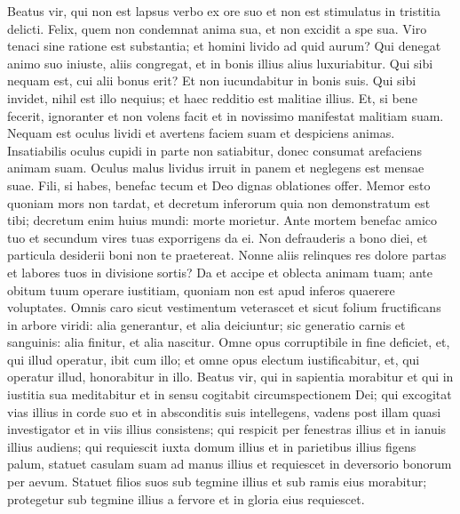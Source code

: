 \begin{biblechapter}  
\verse Beatus vir, qui non est lapsus verbo ex ore suo et non est stimulatus in tristitia delicti. 
\verse Felix, quem non condemnat anima sua, et non excidit a spe sua. 
\verse Viro tenaci sine ratione est substantia; et homini livido ad quid aurum? 
\verse Qui denegat animo suo iniuste, aliis congregat, et in bonis illius alius luxuriabitur. 
\verse Qui sibi nequam est, cui alii bonus erit? Et non iucundabitur in bonis suis. 
\verse Qui sibi invidet, nihil est illo nequius; et haec redditio est malitiae illius. 
\verse Et, si bene fecerit, ignoranter et non volens facit et in novissimo manifestat malitiam suam. 
\verse Nequam est oculus lividi et avertens faciem suam et despiciens animas. 
\verse Insatiabilis oculus cupidi in parte non satiabitur, donec consumat arefaciens animam suam. 
\verse Oculus malus lividus irruit in panem et neglegens est mensae suae. 
\verse Fili, si habes, benefac tecum et Deo dignas oblationes offer. 
\verse Memor esto quoniam mors non tardat, et decretum inferorum quia non demonstratum est tibi; decretum enim huius mundi: morte morietur. 
\verse Ante mortem benefac amico tuo et secundum vires tuas exporrigens da ei. 
\verse Non defrauderis a bono diei, et particula desiderii boni non te praetereat. 
\verse Nonne aliis relinques res dolore partas et labores tuos in divisione sortis? 
\verse Da et accipe et oblecta animam tuam; 
\verse ante obitum tuum operare iustitiam, quoniam non est apud inferos quaerere voluptates. 
\verse Omnis caro sicut vestimentum veterascet et sicut folium fructificans in arbore viridi: alia generantur, et alia deiciuntur; 
\verse sic generatio carnis et sanguinis: alia finitur, et alia nascitur. 
\verse Omne opus corruptibile in fine deficiet, et, qui illud operatur, ibit cum illo; 
\verse et omne opus electum iustificabitur, et, qui operatur illud, honorabitur in illo. 
\verse Beatus vir, qui in sapientia morabitur et qui in iustitia sua meditabitur et in sensu cogitabit circumspectionem Dei; 
\verse qui excogitat vias illius in corde suo et in absconditis suis intellegens, vadens post illam quasi investigator et in viis illius consistens; 
\verse qui respicit per fenestras illius et in ianuis illius audiens; 
\verse qui requiescit iuxta domum illius et in parietibus illius figens palum, statuet casulam suam ad manus illius et requiescet in deversorio bonorum per aevum. 
\verse Statuet filios suos sub tegmine illius et sub ramis eius morabitur; 
\verse protegetur sub tegmine illius a fervore et in gloria eius requiescet. 
\end{biblechapter}

